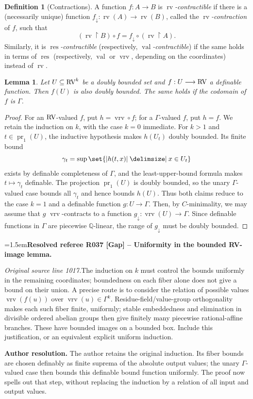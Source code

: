 \documentclass[12pt]{amsart}
\newcommand{\ResolvedRefereeRemark}[5]{%
  \par\medskip\begingroup\normalfont\small\color{gray}%
  \emergencystretch=1.5em\noindent\textbf{Resolved referee R#1 [#2] -- #3.}\par\nobreak\noindent #4\par
  \medskip\color{ResolutionGreen}\noindent\textbf{Author resolution.} #5\par
  \endgroup\medskip
}
\newcommand{\memph}[1]{{\color{magenta}\emph{#1}}}
\theoremstyle{plain}
\newtheorem{lem}[thm]{Lemma}
\theoremstyle{definition}
\newtheorem{defn}[thm]{Definition}
\theoremstyle{remark}
\numberwithin{equation}{section}
\theoremstyle{plain}
\newcommand{\RV}{\textup{RV}}
\DeclareMathOperator{\pr}{pr}
\DeclareMathOperator{\res}{res}  %
\newcommand{\Q}{\mathds{Q}}
\newcommand{\cmin}{$C$\nobreakdash}
\newcommand{\0}{\emptyset}
\newcommand{\rest}{\upharpoonright}
\newcommand{\fun}{\longrightarrow}
\newcommand{\efun}{\longmapsto}
\newcommand{\sub}{\subseteq}
\providecommand\given{}
\newcommand\SetSymbol[1][]{%
\nonscript \: #1 \vert
\allowbreak
\nonscript\:
\mathopen{}}
\renewcommand\given{\SetSymbol[\delimsize]}
\DeclareMathOperator{\rv}{rv}
\DeclareMathOperator{\vv}{val}
\DeclareMathOperator{\vrv}{vrv}
\begin{document}
\begin{defn}[Contractions]\label{defn:corr:cont}
A function $f : A \fun B$ is \memph{$\rv$-contractible} if there is a (necessarily unique) function $f_{\downarrow} : \rv(A) \fun \rv(B)$, called the \memph{$\rv$-contraction} of $f$, such that
\[
(\rv \rest B) \circ f = f_{\downarrow} \circ (\rv \rest A).
\]
Similarly, it is \memph{$\res$-contractible} (respectively, \memph{$\vv$-contractible}) if the same holds in terms of $\res$ (respectively, $\vv$ or $\vrv$, depending on the coordinates) instead of $\rv$.
\end{defn}


\begin{lem}\label{db:to:db}
Let $U \sub \RV^k$ be a doubly bounded set and $f: U \fun \RV$ a definable function. Then $f(U)$ is also doubly bounded. The same holds if the codomain of $f$ is $\Gamma$.
\end{lem}
\begin{proof}
For an $\RV$-valued $f$, put $h=\vrv\circ f$; for a $\Gamma$-valued $f$, put $h=f$. We retain the induction on $k$, with the case $k=0$ immediate. For $k>1$ and $t\in\pr_1(U)$, the inductive hypothesis makes $h(U_t)$ doubly bounded. Its finite bound
\[
\gamma_t=\sup\set{|h(t,x)|\given x\in U_t}
\]
exists by definable completeness of $\Gamma$, and the least-upper-bound formula makes $t\efun\gamma_t$ definable. The projection $\pr_1(U)$ is doubly bounded, so the unary $\Gamma$-valued case bounds all $\gamma_t$ and hence bounds $h(U)$. Thus both claims reduce to the case $k=1$ and a definable function $g:U\fun\Gamma$. Then, by \cmin-minimality, we may assume that $g$  $\vrv$-contracts to a function $g_{\downarrow} : \vrv(U) \fun \Gamma$. Since definable functions in $\Gamma$ are piecewise $\Q$-linear, the range of $g_{\downarrow}$ must be doubly bounded.
\end{proof}

\ResolvedRefereeRemark{037}{Gap}{Uniformity in the bounded RV-image lemma}{%
\textit{Original source line 1017.}\quad The induction on $k$ must control the bounds uniformly in the remaining coordinates; boundedness on each fiber alone does not give a bound on their union. A precise route is to consider the relation of possible values $\vrv(f(u))$ over $\vrv(u)\in\Gamma^k$. Residue-field/value-group orthogonality makes each such fiber finite, uniformly; stable embeddedness and elimination in divisible ordered abelian groups then give finitely many piecewise rational-affine branches. These have bounded images on a bounded box. Include this justification, or an equivalent explicit uniform induction.
}{The author retains the original induction. Its fiber bounds are chosen definably as finite suprema of the absolute output values; the unary $\Gamma$-valued case then bounds this definable bound function uniformly. The proof now spells out that step, without replacing the induction by a relation of all input and output values.}
\end{document}
